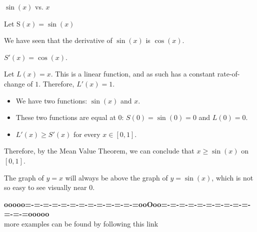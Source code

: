 \documentclass{ximera}
\begin{document}
\begin{example} $\sin(x)$ vs. $x$


Let S$(x) = \sin(x)$

We have seen that the derivative of $\sin(x)$ is $\cos(x)$.

$S'(x) = \cos(x)$.

Let $L(x) = x$.  This is a linear function, and as such has a constant rate-of-change of $1$.  Therefore, $L'(x) = 1$. 


\begin{itemize}
\item We have two functions: $\sin(x)$ and $x$. 
\item These two functions are equal at $0$: $S(0) = \sin(0) = 0$ and $L(0) = 0$.
\item $L'(x) \geq S'(x)$ for every $x \in [0,1]$.
\end{itemize}




Therefore, by the Mean Value Theorem, we can conclude that $x \geq \sin(x)$ on $[0,1]$.

The graph of $y = x$ will always be above the graph of $y = \sin(x)$, which is not so easy to see visually near $0$.





\begin{center}
\end{center}







\end{example}




































\begin{center}
\textbf{\textcolor{green!50!black}{ooooo=-=-=-=-=-=-=-=-=-=-=-=-=ooOoo=-=-=-=-=-=-=-=-=-=-=-=-=ooooo}} \\

more examples can be found by following this link\\ 

\end{center}
\end{document}
